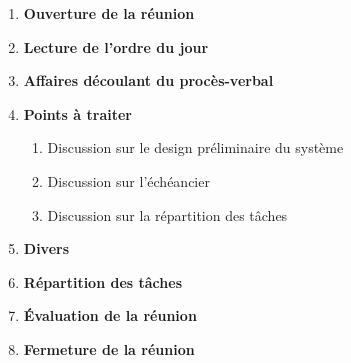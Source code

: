 \documentclass[12pt]{ULojpv}
\begin{document}
\entete
\begin{enumerate}
   \item \textbf{Ouverture de la réunion}
   \item \textbf{Lecture de l'ordre du jour}
   \item \textbf{Affaires découlant du procès-verbal}
   
   \item \textbf{Points à traiter}
      \begin{enumerate}
         \item Discussion sur le design préliminaire du système
         \item Discussion sur l'échéancier
         \item Discussion sur la répartition des tâches
      \end{enumerate}
   \item \textbf{Divers}
   \item \textbf{Répartition des tâches}
   \item \textbf{Évaluation de la réunion}

   \item \textbf{Fermeture de la réunion}
\end{enumerate}
\end{document}
